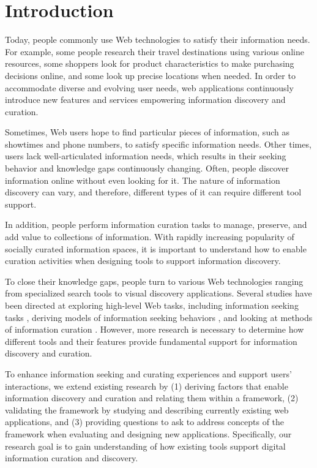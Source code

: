 \documentclass{casconpaper}
\begin{document}
{\section{Introduction}
Today, people commonly use Web technologies to satisfy their information needs. For example, some people research their travel destinations using various online resources, some shoppers look for product characteristics to make purchasing decisions online, and some look up precise locations when needed. In order to accommodate diverse and evolving user needs, web applications continuously introduce new features and services empowering information discovery and curation. 

Sometimes, Web users hope to find particular pieces of information, such as showtimes and phone numbers, to satisfy specific information needs. Other times, users lack well-articulated information needs, which results in their seeking behavior and knowledge gaps continuously changing. Often, people discover information online without even looking for it. The nature of information discovery can vary, and therefore, different types of it can require different tool support.  

In addition, people perform information curation tasks to manage, preserve, and add value to collections of information. With rapidly increasing popularity of socially curated information spaces, it is important to understand how to enable curation activities when designing tools to support information discovery.

To close their knowledge gaps, people turn to various Web technologies ranging from specialized search tools to visual discovery applications. Several studies have been directed at exploring high-level Web tasks, including information seeking tasks \cite{morrison, kellar2006, kellar2007}, deriving models of information seeking behaviors \cite{choo}, and looking at methods of information curation \cite{wittaker}. However, more research is necessary to determine how different tools and their features provide fundamental support for information discovery and curation.

To enhance information seeking and curating experiences and support users' interactions, we extend existing research by (1) deriving factors that enable information discovery and curation and relating them within a framework, (2) validating the framework by studying and describing currently existing web applications, and (3) providing questions to ask to address concepts of the framework when evaluating and designing new applications. Specifically, our research goal is to gain understanding of how existing tools support digital information curation and discovery. 

}
\end{document}

